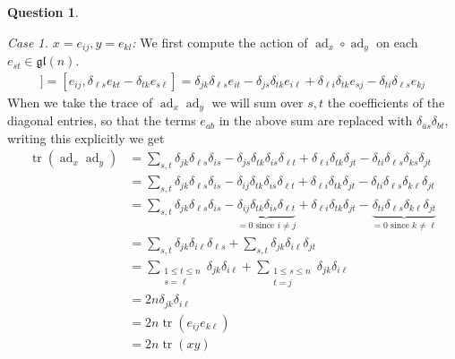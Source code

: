 \documentclass[10.5pt]{article}
\theoremstyle{definition}
\newtheorem{pb}{Question}
\numberwithin{example}{subsection}
\numberwithin{proposition}{subsection}
\begin{document}
\begin{pb}
\begin{enumerate}
            \emph{Case 1. \(x = e_{ij}, y = e_{kl}\):} We first compute the action of \(\operatorname{ad}_x \circ \operatorname{ad}_y\) on each \(e_{st} \in \mathfrak{gl}(n)\).
            \begin{align}
                [e_{ij},[e_{k,\ell},e_{st}]] = [e_{ij},\delta_{\ell s}e_{kt} - \delta_{tk}e_{s\ell}] = \delta_{jk}\delta_{\ell s}e_{it} - \delta_{js}\delta_{tk}e_{i\ell} + \delta_{\ell i}\delta_{tk}e_{sj} - \delta_{ti}\delta_{\ell s}e_{kj}
            \end{align}
            When we take the trace of \(\operatorname{ad}_x \operatorname{ad}_y\) we will sum over \(s,t\) the coefficients of the diagonal entries, so that the terms \(e_{ab}\) in the above sum are replaced with \(\delta_{as}\delta_{bt}\), writing this explicitly we get
            \begin{align}
                \operatorname{tr}(\operatorname{ad}_x \operatorname{ad}_y) &= \sum_{s,t} \delta_{jk}\delta_{\ell s}\delta_{is} - \delta_{js}\delta_{tk}\delta_{is}\delta_{\ell t} + \delta_{\ell i}\delta_{tk}\delta_{jt} - \delta_{ti}\delta_{\ell s}\delta_{ks}\delta_{jt} \\
                &= \sum_{s,t} \delta_{jk}\delta_{\ell s}\delta_{is} - \delta_{ij}\delta_{tk}\delta_{is}\delta_{\ell t} + \delta_{\ell i}\delta_{tk}\delta_{jt} - \delta_{ti}\delta_{\ell s}\delta_{k\ell}\delta_{jt} \\
                &= \sum_{s,t} \delta_{jk}\delta_{\ell s}\delta_{is} - \underbrace{\delta_{ij}\delta_{tk}\delta_{is}\delta_{\ell t}}_{=0 \text{ since } i \neq j} + \delta_{\ell i}\delta_{tk}\delta_{jt} - \underbrace{\delta_{ti}\delta_{\ell s}\delta_{k\ell}\delta_{jt}}_{=0 \text{ since } k \neq \ell} \\
                &= \sum_{s,t} \delta_{jk}\delta_{i \ell}\delta_{\ell s} + \sum_{s,t} \delta_{jk}\delta_{i\ell} \delta_{jt} \\
                &= \sum_{\substack{1 \leq t \leq n \\ s = \ell}}\delta_{jk}\delta_{i \ell} + \sum_{\substack{1 \leq s \leq n \\ t = j}} \delta_{jk}\delta_{i\ell} \\
                &= 2n \delta_{jk}\delta_{i\ell} \\
                &= 2n \operatorname{tr}(e_{ij}e_{k\ell}) \\
                &= 2n \operatorname{tr}(xy)
            \end{align}


\end{enumerate}
\end{pb}
\end{document}
